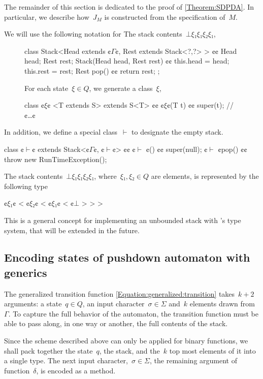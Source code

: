 The remainder of this section is dedicated to the proof of \cref{Theorem:SDPDA}.
In particular, we describe how~$J_M$ is constructed from the
  specification of~$M$.

We will use the following notation for
The stack contents~$⊥ξ₁ξ₁ξ₂ξ₁$,

\begin{figure}[H]
\begin{JAVA}
class Stack<Head extends ¢$Γ$¢, Rest extends Stack<?,?> > {¢¢
  Head head;
  Rest rest;
  Stack(Head head, Rest rest) {¢¢ this.head = head; this.rest = rest;}
  Rest pop() {¢¢ return rest; };
}
\end{JAVA}
For each state~$ξ∈Q$, we generate a \Java class~$ξ$,
\begin{JAVA}
class ¢$ξ$¢ <T extends S> extends S<T> {¢¢
  ¢$ξ$¢(T t) {¢¢ super(t); }
  // ¢…¢
}
\end{JAVA}
\end{figure}
In addition, we define a special class~$\vdash$ to designate the empty stack.
\begin{JAVA}
class ¢$\vdash$¢ extends Stack<¢$Γ$¢, ¢$\vdash$¢> {¢¢
  ¢$\vdash$ ¢() {¢¢ super(null); }
  ¢$\vdash$ ¢pop() {¢¢ throw new RunTimeException(); }
}
\end{JAVA}
The stack contents~$⊥ξ₁ξ₁ξ₂ξ₁$,
where~$ξ₁,ξ₂∈Q$ are elements,
is represented by the following type
\begin{JAVA}
  ¢$ξ₁$¢ < ¢$ξ₂$¢ < ¢$ξ₁$¢ < ¢$⊥$ > > >
\end{JAVA}
This is a general concept for implementing an unbounded stack with \Java's type system,
that will be extended in the future.


\subsection{Encoding states of pushdown automaton with \Java generics}
The generalized transition function \cref{Equation:generalized:transition}
  takes~$k+2$ arguments: a state~$q∈Q$, an input character~$σ∈Σ$
    and~$k$ elements drawn from~$Γ$.
To capture the full behavior of the automaton, the transition function
  must be able to pass along, in one way or another, the full contents of the stack.

Since the scheme described above can only be applied for binary functions,
  we shall pack together the state~$q$, the stack, and the~$k$ top most
  elements of it into a single type.
The next input character,~$σ∈Σ$, the remaining argument of function~$δ$,
  is encoded as a method.

